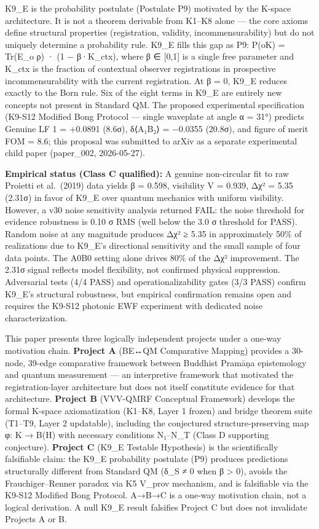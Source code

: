 \documentclass[
  11pt,
]{article}
\begin{document}
K9\_E is the probability postulate (Postulate P9) motivated by the
K-space architecture. It is not a theorem derivable from K1--K8 alone
--- the core axioms define structural properties (registration,
validity, incommensurability) but do not uniquely determine a
probability rule. K9\_E fills this gap as P9: P(o\textbar K) = Tr(E\_o
ρ) · (1 − β·K\_ctx), where β ∈ {[}0,1{]} is a single free parameter and
K\_ctx is the fraction of contextual observer registrations in
prospective incommensurability with the current registration. At β = 0,
K9\_E reduces exactly to the Born rule. Six of the eight terms in K9\_E
are entirely new concepts not present in Standard QM. The proposed
experimental specification (K9-S12 Modified Bong Protocol --- single
waveplate at angle α = 31°) predicts Genuine LF 1 = +0.0891 (8.6σ),
δ⟨A₁B₂⟩ = −0.0355 (20.8σ), and figure of merit FOM = 8.6; this proposal
was submitted to arXiv as a separate experimental child paper
(paper\_002, 2026-05-27).

\textbf{Empirical status (Class C qualified):} A genuine non-circular
fit to raw Proietti et al.~(2019) data yields β = 0.598, visibility V =
0.939, Δχ² = 5.35 (2.31σ) in favor of K9\_E over quantum mechanics with
uniform visibility. However, a v30 noise sensitivity analysis returned
FAIL: the noise threshold for evidence robustness is 0.10 σ RMS (well
below the 3.0 σ threshold for PASS). Random noise at any magnitude
produces Δχ² ≥ 5.35 in approximately 50\% of realizations due to K9\_E's
directional sensitivity and the small sample of four data points. The
A0B0 setting alone drives 80\% of the Δχ² improvement. The 2.31σ signal
reflects model flexibility, not confirmed physical suppression.
Adversarial tests (4/4 PASS) and operationalizability gates (3/3 PASS)
confirm K9\_E's structural robustness, but empirical confirmation
remains open and requires the K9-S12 photonic EWF experiment with
dedicated noise characterization.

This paper presents three logically independent projects under a one-way
motivation chain. \textbf{Project A} (BE↔QM Comparative Mapping)
provides a 30-node, 39-edge comparative framework between Buddhist
Pramāṇa epistemology and quantum measurement --- an interpretive
framework that motivated the registration-layer architecture but does
not itself constitute evidence for that architecture. \textbf{Project B}
(VVV-QMRF Conceptual Framework) develops the formal K-space
axiomatization (K1--K8, Layer 1 frozen) and bridge theorem suite
(T1--T9, Layer 2 updatable), including the conjectured
structure-preserving map φ: K → B(H) with necessary conditions N₁--N\_T
(Class D supporting conjecture). \textbf{Project C} (K9\_E Testable
Hypothesis) is the scientifically falsifiable claim: the K9\_E
probability postulate (P9) produces predictions structurally different
from Standard QM (δ\_S ≠ 0 when β \textgreater{} 0), avoids the
Frauchiger--Renner paradox via K5 V\_prov mechanism, and is falsifiable
via the K9-S12 Modified Bong Protocol. A→B→C is a one-way motivation
chain, not a logical derivation. A null K9\_E result falsifies Project C
but does not invalidate Projects A or B.
\end{document}
